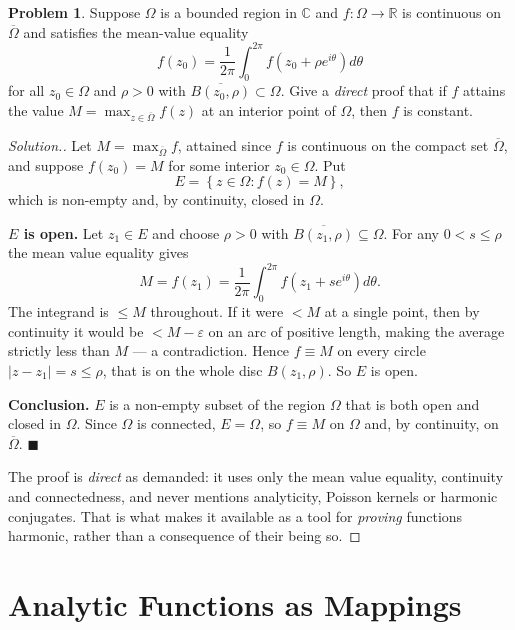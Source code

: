 \documentclass[11pt,a4paper]{article}
\theoremstyle{definition}
\newtheorem{problemx}{Problem}[section]
\newenvironment{problem}{\begin{problemx}}{\end{problemx}}
\newenvironment{solution}
  {\renewcommand{\qedsymbol}{}\begin{proof}[\textit{Solution}.]}
  {\end{proof}}
\begin{document}
\begin{problem}
Suppose $\Omega$ is a bounded region in $\mathbb{C}$ and
$f : \Omega \rightarrow \mathbb{R}$ is continuous on $\overline{\Omega}$ and
satisfies the mean-value equality
$$f(z_0) = \frac{1}{2\pi}\int^{2\pi}_{0} f\!\left(z_0 + \rho e^{i\theta}\right)d\theta$$
for all $z_0 \in \Omega$ and $\rho > 0$ with
$\overline{B(z_0,\rho)} \subset \Omega$. Give a \emph{direct} proof that if $f$
attains the value $M = \max_{z \in \overline{\Omega}} f(z)$ at an interior point
of $\Omega$, then $f$ is constant.
\end{problem}

\begin{solution}
Let $M = \max_{\overline{\Omega}} f$, attained since $f$ is continuous on the
compact set $\overline{\Omega}$, and suppose $f(z_0) = M$ for some interior
$z_0 \in \Omega$. Put
$$E = \left\{z \in \Omega : f(z) = M\right\},$$
which is non-empty and, by continuity, closed in $\Omega$.

\textbf{$E$ is open.} Let $z_1 \in E$ and choose $\rho > 0$ with
$\overline{B(z_1,\rho)} \subseteq \Omega$. For any $0 < s \leq \rho$ the mean value
equality gives
$$M = f(z_1) = \frac{1}{2\pi}\int^{2\pi}_{0} f\!\left(z_1 + se^{i\theta}\right)d\theta .$$
The integrand is $\leq M$ throughout. If it were $< M$ at a single point, then by
continuity it would be $< M - \varepsilon$ on an arc of positive length, making the
average strictly less than $M$ --- a contradiction. Hence $f \equiv M$ on every
circle $\left|z - z_1\right| = s \leq \rho$, that is on the whole disc
$B(z_1,\rho)$. So $E$ is open.

\textbf{Conclusion.} $E$ is a non-empty subset of the region $\Omega$ that is both
open and closed in $\Omega$. Since $\Omega$ is connected, $E = \Omega$, so
$f \equiv M$ on $\Omega$ and, by continuity, on $\overline{\Omega}$.
$\blacksquare$

The proof is \emph{direct} as demanded: it uses only the mean value equality,
continuity and connectedness, and never mentions analyticity, Poisson kernels or
harmonic conjugates. That is what makes it available as a tool for \emph{proving}
functions harmonic, rather than a consequence of their being so.
\end{solution}

\pagebreak
{\color[wave]{485}\section{Analytic Functions as Mappings}}
\end{document}

